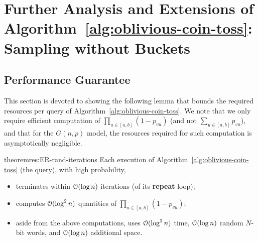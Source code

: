 \section{Further Analysis and Extensions of Algorithm~\ref{alg:oblivious-coin-toss}: Sampling  without Buckets}
\label{sec:reroll-cont}

\subsection{Performance Guarantee}
This section is devoted to showing the following lemma that bounds the required resources per query of Algorithm~\ref{alg:oblivious-coin-toss}. We note that we only require efficient computation of $\prod_{u \in [a,b]} (1-p_{vu})$ (and not $\sum_{u \in [a,b]} p_{vu}$), and that for the $G(n,p)$ model, the resources required for such computation is asymptotically negligible.

\begin{restatable}{theorem}{res:ER-rand-iterations}\label{thm:ER-rand-iterations}
Each execution of Algorithm~\ref{alg:oblivious-coin-toss} (the  query), with high probability,
\begin{itemize}
\item terminates within $\mathcal{O}(\log n)$ iterations (of its \textup{\textbf{repeat}} loop);
\item computes $\mathcal{O}(\log^2 n)$ quantities of $\prod_{u \in [a,b]} (1-p_{vu})$;
\item aside from the above computations, uses $\mathcal{O}(\log^2 n)$ time, $\mathcal{O}(\log n)$ random $N$-bit words, and $\mathcal{O}(\log n)$ additional space.
\end{itemize}
\end{restatable}

